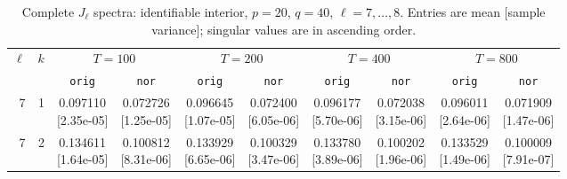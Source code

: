 \documentclass[12pt,letterpaper]{article}
\def\spacingset#1{\renewcommand{\baselinestretch}{#1}\small\normalsize}
\theoremstyle{plain}
\theoremstyle{definition}
\begin{document}
\clearpage
\begin{table}[p]
\begingroup
\spacingset{1.0}
\small\centering
\caption{Complete $J_\ell$ spectra: identifiable interior, $p=20$, $q=40$, $\ell=7,\ldots,8$. Entries are mean [sample variance]; singular values are in ascending order.}
\label{s23:lambda:alltab:spectra:p20q40interior:7-8}
\footnotesize
\setlength{\tabcolsep}{2.2pt}
\renewcommand{\arraystretch}{1.03}
\begin{adjustbox}{max width=\linewidth}
\begin{tabular}{@{}rr*{8}{c}@{}}
\toprule
$\ell$ & $k$ & \multicolumn{2}{c}{$T=100$} & \multicolumn{2}{c}{$T=200$} & \multicolumn{2}{c}{$T=400$} & \multicolumn{2}{c}{$T=800$}\\
\cmidrule(lr){3-4}\cmidrule(lr){5-6}\cmidrule(lr){7-8}\cmidrule(lr){9-10}
 &  & \texttt{orig} & \texttt{nor} & \texttt{orig} & \texttt{nor} & \texttt{orig} & \texttt{nor} & \texttt{orig} & \texttt{nor}\\
\midrule
7 & 1 & \shortstack{0.097110\\[-1pt]{\scriptsize[2.35e-05]}} & \shortstack{0.072726\\[-1pt]{\scriptsize[1.25e-05]}} & \shortstack{0.096645\\[-1pt]{\scriptsize[1.07e-05]}} & \shortstack{0.072400\\[-1pt]{\scriptsize[6.05e-06]}} & \shortstack{0.096177\\[-1pt]{\scriptsize[5.70e-06]}} & \shortstack{0.072038\\[-1pt]{\scriptsize[3.15e-06]}} & \shortstack{0.096011\\[-1pt]{\scriptsize[2.64e-06]}} & \shortstack{0.071909\\[-1pt]{\scriptsize[1.47e-06]}}\\
7 & 2 & \shortstack{0.134611\\[-1pt]{\scriptsize[1.64e-05]}} & \shortstack{0.100812\\[-1pt]{\scriptsize[8.31e-06]}} & \shortstack{0.133929\\[-1pt]{\scriptsize[6.65e-06]}} & \shortstack{0.100329\\[-1pt]{\scriptsize[3.47e-06]}} & \shortstack{0.133780\\[-1pt]{\scriptsize[3.89e-06]}} & \shortstack{0.100202\\[-1pt]{\scriptsize[1.96e-06]}} & \shortstack{0.133529\\[-1pt]{\scriptsize[1.49e-06]}} & \shortstack{0.100009\\[-1pt]{\scriptsize[7.91e-07]}}\\

\end{tabular}
\end{adjustbox}
\end{table}
\end{document}
